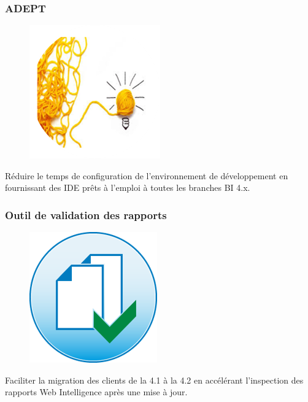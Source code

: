 \subsubsection{ADEPT}
\begin{figure}[H]
  \centering
      \includegraphics{images/adept.png}
\end{figure}
Réduire le temps de configuration de l'environnement de développement en fournissant des IDE prêts à l'emploi à toutes les branches BI 4.x.

\subsubsection{Outil de validation des rapports}
\begin{figure}[H]
  \centering
      \includegraphics{images/validationtool.png}
\end{figure}
Faciliter la migration des clients de la 4.1 à la 4.2 en accélérant l'inspection des rapports Web Intelligence après une mise à jour.



